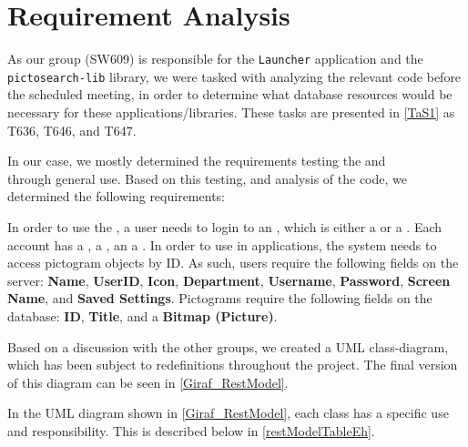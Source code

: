 \section{Requirement Analysis}
As our group (SW609) is responsible for the \texttt{Launcher} application and
the \\\texttt{pictosearch-lib} library, we were tasked with analyzing the
relevant code before the scheduled meeting, in order to determine what database resources
would be necessary for these applications/libraries. These tasks are presented
in \autoref{TaS1} as T636, T646, and T647.\nl

In our case, we mostly determined the requirements testing the 
and\\  through general use. Based on this testing, and
analysis of the code, we determined the following requirements:\nl

In order to use the , a user needs to login to an
, which is either a  or a . Each
account has a , a , an a .
In order to use  in applications, the system needs to access
pictogram objects by ID. As such, users require the following fields on the
server: \textbf{Name}, \textbf{UserID}, \textbf{Icon}, \textbf{Department},
\textbf{Username}, \textbf{Password}, \textbf{Screen Name}, and \textbf{Saved
Settings}.
Pictograms require the following fields on the database: \textbf{ID},
\textbf{Title}, and a \textbf{Bitmap (Picture)}.\nl

Based on a discussion with the other groups, we created a UML class-diagram,
which has been subject to redefinitions throughout the project. The final
version of this diagram can be seen in \autoref{Giraf_RestModel}.


In the UML diagram shown in \autoref{Giraf_RestModel}, each class has a
specific use and responsibility. This is described below in
\autoref{restModelTableEh}.

